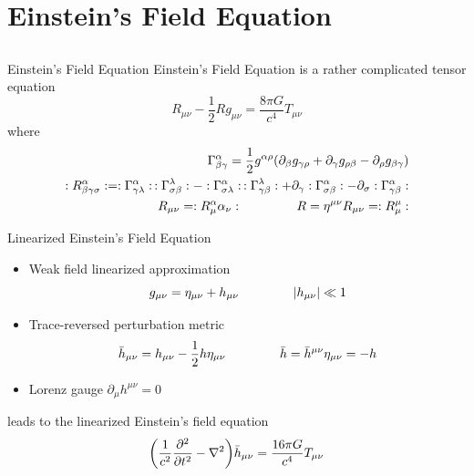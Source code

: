 \documentclass{beamer}
\newcommand{\bea}{\setlength{\jot}{10pt}\begin{eqnarray*}}
\newcommand{\eea}{\end{eqnarray*}}
\theoremstyle{definition}
\theoremstyle{plain}
\begin{document}
\section{Einstein's Field Equation}
\subsection{}
\begin{frame}{Einstein's Field Equation}
	Einstein's Field Equation is a rather complicated tensor equation
	\[
	R_{\mu \nu} - \dfrac{1}{2} R g_{\mu \nu} = 
\dfrac{8 \pi G}{c^4} T_{\mu \nu}
	\]
	\vspace{0.8cm}
	where
\bea
\Gamma ^{\alpha} _{\beta \gamma} = 
\dfrac{1}{2} g^{\alpha \rho} \qty(
\partial_\beta g_{\gamma \rho} + 
\partial_\gamma g_{\rho \beta} -
\partial_\rho g_{\beta \gamma}
)
\\
: R^\alpha _{\beta \gamma \sigma}:
=
:\Gamma ^\alpha _{\gamma \lambda}:\,
:\Gamma ^\lambda _{\sigma \beta}:
-
:\Gamma ^\alpha _{\sigma \lambda}:\,
:\Gamma ^\lambda _{\gamma \beta}:
+
\partial_\gamma :\Gamma^\alpha _{\sigma \beta}: 
-
\partial_\sigma :\Gamma^\alpha _{\gamma \beta} :
\\
R_{\mu \nu} = :R^\alpha _\mu \alpha _\nu: \hspace{1.5cm}
R=\eta^{\mu \nu} R_{\mu \nu} = :R^{\mu} _\mu:
\eea	
\end{frame}

\begin{frame}{Linearized Einstein's Field Equation}
\begin{itemize}
\item Weak field linearized approximation
	\[
	g_{\mu \nu} = \eta_{\mu \nu} + h_{\mu \nu} \hspace{1.5cm}
	\abs{h_{\mu \nu}}\ll 1
	\]
\item Trace-reversed perturbation metric
\[
\bar{h} _{\mu \nu} = h_{\mu \nu} - \dfrac{1}{2} h \eta_{\mu \nu} \hspace{1.5cm} \bar{h}=\bar{h}^{\mu \nu} \eta_{\mu \nu} = - h
\]
\item Lorenz gauge $\partial_{\mu} h^{\mu \nu}=0$\\ 
\end{itemize}
leads to the linearized Einstein's field equation
\\
\vspace{0.3cm}
\[
\qty(
\dfrac{1}{c^{2}}
\pdv[2]{}{t}
-
\nabla ^{2}
)
\bar{h} _{\mu \nu} =\dfrac{16 \pi G}{c^{4}} T_{\mu \nu}
\]
\end{frame}
\end{document}
